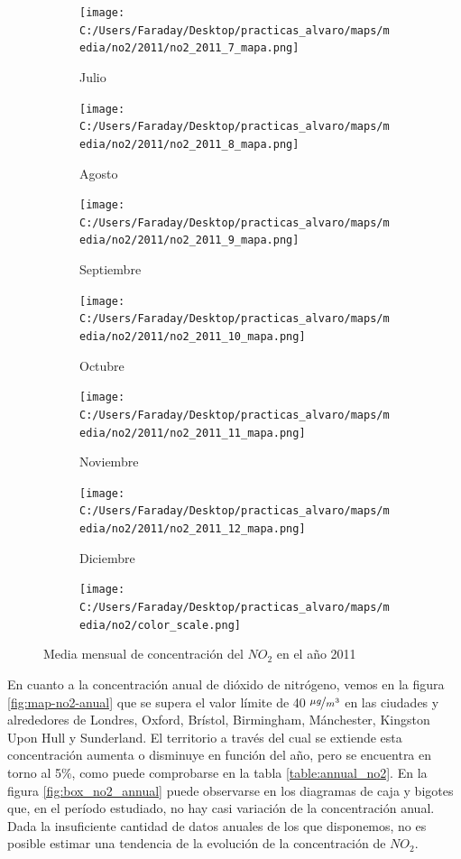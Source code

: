 \documentclass[12pt]{article}
\begin{document}
\begin{figure}[H]
\begin{subfigure}[H]{0.15\textwidth}
\texttt{[image: C:/Users/Faraday/Desktop/practicas\_alvaro/maps/media/no2/2011/no2\_2011\_7\_mapa.png]}
\captionsetup{labelformat=empty}
\caption{Julio}
\label{fig:map-no2-2011-7}
\end{subfigure}
%
\begin{subfigure}[H]{0.15\textwidth}
\texttt{[image: C:/Users/Faraday/Desktop/practicas\_alvaro/maps/media/no2/2011/no2\_2011\_8\_mapa.png]}
\captionsetup{labelformat=empty}
\caption{Agosto}
\label{fig:map-no2-2011-8}
\end{subfigure}
%
\begin{subfigure}[H]{0.15\textwidth}
\texttt{[image: C:/Users/Faraday/Desktop/practicas\_alvaro/maps/media/no2/2011/no2\_2011\_9\_mapa.png]}
\captionsetup{labelformat=empty}
\caption{Septiembre}
\label{fig:map-no2-2011-9}
\end{subfigure}
%
\begin{subfigure}[H]{0.15\textwidth}
\texttt{[image: C:/Users/Faraday/Desktop/practicas\_alvaro/maps/media/no2/2011/no2\_2011\_10\_mapa.png]}
\captionsetup{labelformat=empty}
\caption{Octubre}
\label{fig:map-no2-2011-10}
\end{subfigure}
%
\begin{subfigure}[H]{0.15\textwidth}
\texttt{[image: C:/Users/Faraday/Desktop/practicas\_alvaro/maps/media/no2/2011/no2\_2011\_11\_mapa.png]}
\captionsetup{labelformat=empty}
\caption{Noviembre}
\label{fig:map-no2-2011-11}
\end{subfigure}
%
\begin{subfigure}[H]{0.15\textwidth}
\texttt{[image: C:/Users/Faraday/Desktop/practicas\_alvaro/maps/media/no2/2011/no2\_2011\_12\_mapa.png]}
\captionsetup{labelformat=empty}
\caption{Diciembre}
\label{fig:map-no2-2011-12}
\end{subfigure}

\begin{subfigure}[H]{0.45\textwidth}
\texttt{[image: C:/Users/Faraday/Desktop/practicas\_alvaro/maps/media/no2/color\_scale.png]}
\captionsetup{labelformat=empty}
\caption{}
\end{subfigure}

\vspace*{-7mm}
\caption{Media mensual de concentración del $NO_{2}$ en el año 2011}
\label{fig:map-no2-2011}
\end{figure}

En cuanto a la concentración anual de dióxido de nitrógeno, vemos en la figura \ref{fig:map-no2-anual} que se supera el valor límite de 40 $\nicefrac{\mu g}{m^3}$ en las ciudades y alrededores de Londres, Oxford, Brístol, Birmingham, Mánchester, Kingston Upon Hull y Sunderland. El territorio a través del cual se extiende esta concentración aumenta o disminuye en función del año, pero se encuentra en torno al 5\%, como puede comprobarse en la tabla \ref{table:annual_no2}. En la figura \ref{fig:box_no2_annual} puede observarse en los diagramas de caja y bigotes que, en el período estudiado, no hay casi variación de la concentración anual. Dada la insuficiente cantidad de datos anuales de los que disponemos, no es posible estimar una tendencia de la evolución de la concentración de $NO_{2}$.
\end{document}
